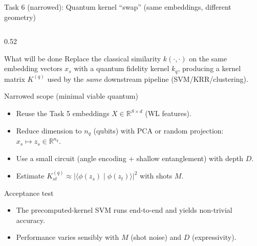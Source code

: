 \documentclass[aspectratio=169,xcolor={dvipsnames}]{beamer}
\newcommand{\R}{\mathbb{R}}
\begin{document}
\begin{frame}[shrink=40]{Task 6 (narrowed): Quantum kernel “swap” (same embeddings, different geometry)}
\small
\begin{columns}[T,onlytextwidth]

\begin{column}{0.52\textwidth}
\begin{block}{What will be done}
Replace the classical similarity $k(\cdot,\cdot)$ on the same embedding vectors $x_s$
with a quantum fidelity kernel $k_q$, producing a kernel matrix $K^{(q)}$ used by the
\emph{same} downstream pipeline (SVM/KRR/clustering).
\end{block}

\begin{block}{Narrowed scope (minimal viable quantum)}
\begin{itemize}\setlength\itemsep{3pt}
\item Reuse the Task 5 embeddings $X\in\R^{S\times d}$ (WL features).
\item Reduce dimension to $n_q$ (qubits) with PCA or random projection: $x_s\mapsto z_s\in\R^{n_q}$.
\item Use a small circuit (angle encoding + shallow entanglement) with depth $D$.
\item Estimate $K^{(q)}_{st}\approx|\langle\phi(z_s)\mid\phi(z_t)\rangle|^2$ with shots $M$.
\end{itemize}
\end{block}

\begin{block}{Acceptance test}
\begin{itemize}\setlength\itemsep{2pt}
\item The precomputed-kernel SVM runs end-to-end and yields non-trivial accuracy.
\item Performance varies sensibly with $M$ (shot noise) and $D$ (expressivity).
\end{itemize}
\end{block}
\end{column}


\end{columns}
\end{frame}
\end{document}
